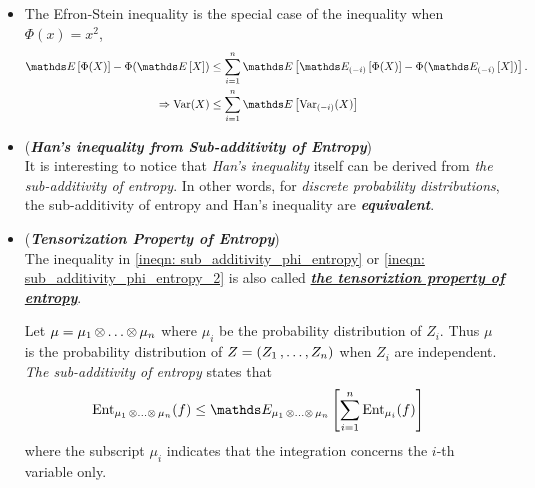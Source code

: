 \documentclass[11pt]{article}
\begin{document}
\begin{itemize}
\item \begin{remark}
The Efron-Stein inequality is the special case of the inequality when $\Phi(x) = x^2$,
\begin{align*}
\E{}{\Phi(X)} - \Phi(\E{}{X}) &\le \sum_{i=1}^{n}\E{}{\E{(-i)}{\Phi(X)} - \Phi(\E{(-i)}{X})}.\\
\Rightarrow \text{Var}(X) &\le \sum_{i=1}^{n}\E{}{\text{Var}_{(-i)}(X)}
\end{align*} 
\end{remark}

\item \begin{remark} (\textbf{\emph{Han's inequality from Sub-additivity of Entropy}}) \citep{boucheron2013concentration} \\
It is interesting to notice that \emph{Han's inequality} itself can be derived from \emph{the sub-additivity of entropy}. In other words, for \emph{discrete probability distributions}, the sub-additivity of entropy and Han's inequality are \emph{\textbf{equivalent}}. 
\end{remark}

\item \begin{remark} (\textbf{\emph{Tensorization Property of Entropy}}) \citep{wainwright2019high}\\
The inequality in \eqref{ineqn: sub_additivity_phi_entropy} or \eqref{ineqn: sub_additivity_phi_entropy_2} is also called \underline{\emph{\textbf{the tensoriztion property of entropy}}}. 

Let $\mu = \mu_1 \,{\otimes}\ldots{\otimes}\, \mu_n$ where $\mu_i$ be the probability distribution of $Z_i$. Thus $\mu$ is the probability distribution of $Z = (Z_1 \,{,}\ldots{,}\, Z_n)$ when $Z_i$ are independent. \emph{The sub-additivity of entropy} states that
\begin{align*}
\text{Ent}_{\mu_1 \xdotx{\otimes} \mu_n}(f) &\le \E{\mu_1 \xdotx{\otimes} \mu_n}{\sum_{i=1}^{n}\text{Ent}_{\mu_i}(f)}
\end{align*} where the subscript $\mu_i$ indicates that the integration concerns the $i$-th variable only.
\end{remark}


\end{itemize}
\end{document}
